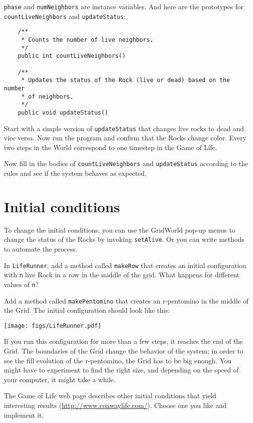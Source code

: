 \documentclass[12pt]{book}
\theoremstyle{definition}
\begin{document}
{\tt phase} and {\tt numNeighbors} are instance variables.
And here are the prototypes for {\tt countLiveNeighbors} and
{\tt updateStatus}:

\begin{lstlisting}
    /**
     * Counts the number of live neighbors.
     */
    public int countLiveNeighbors() 

    /**
     * Updates the status of the Rock (live or dead) based on the number
     * of neighbors.
     */
    public void updateStatus()
\end{lstlisting}

Start with a simple version of {\tt updateStatus} that changes live
rocks to dead and vice versa.  Now run the program and confirm that
the Rocks change color.  Every two steps in the World correspond to
one timestep in the Game of Life.

Now fill in the bodies of {\tt countLiveNeighbors} and
{\tt updateStatus} according to the rules and see if the system behaves
as expected.


\section{Initial conditions}

To change the initial conditions, you can use the GridWorld pop-up
menus to change the status of the Rocks by invoking {\tt setAlive}.
Or you can write methods to automate the process.

In {\tt LifeRunner}, add a method called {\tt makeRow} that creates
an initial configuration with {\tt n} live Rock in a row in the middle
of the grid.  What happens for different values of {\tt n}?

Add a method called {\tt makePentomino} that creates
an r-pentomino in the middle of the Grid.  The initial configuration
should look like this:

\texttt{[image: figs/LifeRunner.pdf]}

If you run this configuration for more than a few steps, it reaches the
end of the Grid.  The boundaries of the Grid change the behavior of
the system; in order to see the fill evolution of the r-pentomino,
the Grid has to be big enough.  You might have to experiment to find
the right size, and depending on the speed of your computer, it
might take a while.

The Game of Life web page describes other initial conditions that
yield interesting results (\url{http://www.conwaylife.com/}).  Choose
one you like and implement it.
\end{document}
